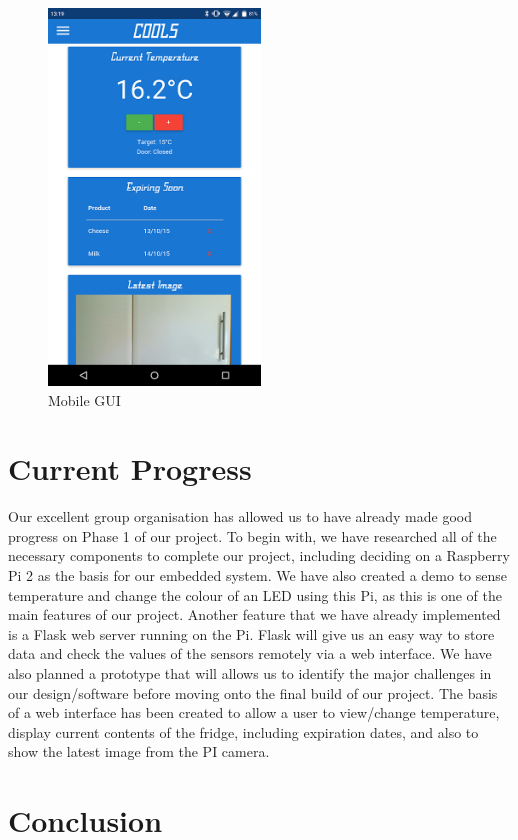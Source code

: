 \documentclass[10pt]{article}
\begin{document}
\begin{figure}[h]
\centering
\caption{Mobile GUI}
\label{Mobile GUI}
\includegraphics[height=10cm]{images/Mobile-Screenshot.png}
\end{figure}

\newpage
\section{Current Progress}

Our excellent group organisation has allowed us to have already made good progress on Phase 1 of our project. To begin with, we have researched all of the necessary components to complete our project, including deciding on a Raspberry Pi 2 as the basis for our embedded system. We have also created a demo to sense temperature and change the colour of an LED using this Pi, as this is one of the main features of our project. Another feature that we have already implemented is a Flask web server running on the Pi. Flask will give us an easy way to store data and check the values of the sensors remotely via a web interface. We have also planned a prototype that will allows us to identify the major challenges in our design/software before moving onto the final build of our project. The basis of a web interface has been created to allow a user to view/change temperature, display current contents of the fridge, including expiration dates, and also to show the latest image from the PI camera.

\section{Conclusion}
\end{document}
